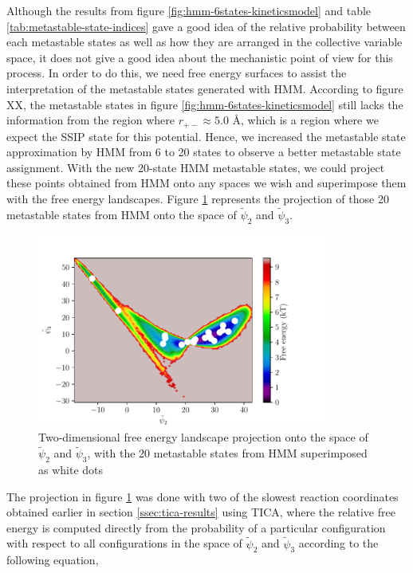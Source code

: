 \begin{spacing}{2.0}
    Although the results from figure \ref{fig:hmm-6states-kineticsmodel} and table \ref{tab:metastable-state-indices} gave a good idea of the 
    relative probability between each metastable states as well as how they are arranged in the collective variable space, it does not give a good 
    idea about the mechanistic point of view for this process. In order to do this, we need free energy surfaces to assist the interpretation of 
    the metastable states generated with HMM. According to figure XX, the metastable states in figure \ref{fig:hmm-6states-kineticsmodel} still 
    lacks the information from the region where $r_{+-} \approx 5.0$ \r{A}, which is a region where we expect the SSIP state for this potential. 
    Hence, we increased the metastable state approximation by HMM from 6 to 20 states to observe a better metastable state assignment. With the 
    new 20-state HMM metastable states, we could project these points obtained from HMM onto any spaces we wish and superimpose them with the free 
    energy landscapes. Figure \ref{fig:free-energy-20states-hmm-tics} represents the projection of those 20 metastable states from HMM onto the 
    space of $\tilde{\psi}_2$ and $\tilde{\psi}_3$.

    \begin{figure}[H]
        \centering
        \includegraphics[width=0.85\textwidth]{./figs/fig3-06}
        \caption{Two-dimensional free energy landscape projection onto the space of $\tilde{\psi}_2$ and $\tilde{\psi}_3$, with the 20 metastable 
                 states from HMM superimposed as white dots}
        \label{fig:free-energy-20states-hmm-tics}
    \end{figure}

    The projection in figure \ref{fig:free-energy-20states-hmm-tics} was done with two of the slowest reaction coordinates obtained earlier in 
    section \ref{ssec:tica-results} using TICA, where the relative free energy is computed directly from the probability of a particular 
    configuration with respect to all configurations in the space of $\tilde{\psi}_2$ and $\tilde{\psi}_3$ according to the following equation,


\end{spacing}
